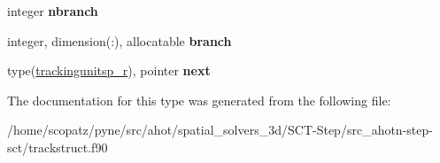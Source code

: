\begin{DoxyCompactItemize}
\item 
\hypertarget{structtracking__data__structures_1_1trackingunitsp__r_a5378c801096551d6d507eb04dd011a6c}{integer {\bfseries nbranch}}\label{structtracking__data__structures_1_1trackingunitsp__r_a5378c801096551d6d507eb04dd011a6c}

\item 
\hypertarget{structtracking__data__structures_1_1trackingunitsp__r_a190f4625d2f13828b2f02ca184121c79}{integer, dimension(\-:), allocatable {\bfseries branch}}\label{structtracking__data__structures_1_1trackingunitsp__r_a190f4625d2f13828b2f02ca184121c79}

\item 
\hypertarget{structtracking__data__structures_1_1trackingunitsp__r_a24d8fb2d7521637baa6381200f4fd753}{type(\hyperlink{structtracking__data__structures_1_1trackingunitsp__r}{trackingunitsp\-\_\-r}), pointer {\bfseries next}}\label{structtracking__data__structures_1_1trackingunitsp__r_a24d8fb2d7521637baa6381200f4fd753}

\end{DoxyCompactItemize}


The documentation for this type was generated from the following file\-:\begin{DoxyCompactItemize}
\item 
/home/scopatz/pyne/src/ahot/spatial\-\_\-solvers\-\_\-3d/\-S\-C\-T-\/\-Step/src\-\_\-ahotn-\/step-\/sct/trackstruct.\-f90\end{DoxyCompactItemize}

